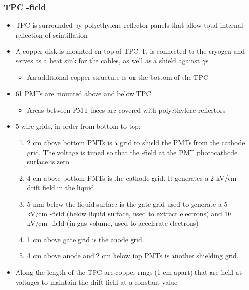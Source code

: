 \subsubsection{TPC \E-field}
\begin{itemize}
  \item TPC is surrounded by polyethylene reflector panels that allow total internal reflection of scintillation
  \item A copper disk is mounted on top of TPC. It is connected to the cryogen and serves as a heat sink for the cables, as well as a shield against $\gamma$s
  \begin{itemize}
    \item An additional copper structure is on the bottom of the TPC
  \end{itemize}
  \item 61 PMTs are mounted above and below TPC
  \begin{itemize}
    \item Areas between PMT faces are covered with polyethylene reflectors
  \end{itemize}
  \item 5 wire grids, in order from bottom to top:
  \begin{enumerate}
    \item 2 cm above bottom PMTs is a grid to shield the PMTs from the cathode grid. The voltage is tuned so that the \E-field at the PMT photocathode surface is zero
    \item 4 cm above bottom PMTs is the cathode grid. It generates a 2 kV/cm drift field in the liquid
    \item 5 mm below the liquid surface is the gate grid used to generate a 5 kV/cm \E-field (below liquid surface, used to extract electrons) and 10 kV/cm \E-field (in gas volume, used to accelerate electrons)
    \item 1 cm above gate grid is the anode grid. 
    \item 4 cm above anode and 2 cm below top PMTs is another shielding grid.
  \end{enumerate}
  \item Along the length of the TPC are copper rings (1 cm apart) that are held at voltages to maintain the drift field at a constant value
\end{itemize}


